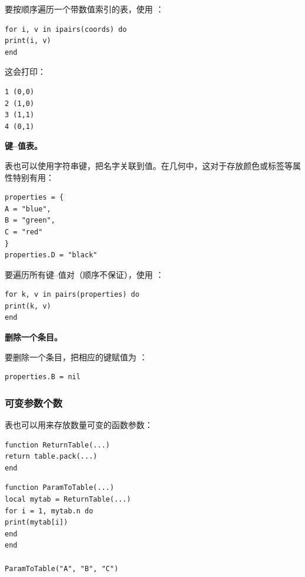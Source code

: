 要按顺序遍历一个带数值索引的表，使用 ：

\begin{mybox}
\begin{verbatim}
for i, v in ipairs(coords) do
print(i, v)
end
\end{verbatim}
\end{mybox}

这会打印：

\begin{verbatim}
1 (0,0)
2 (1,0)
3 (1,1)
4 (0,1)
\end{verbatim}


\textbf{键–值表。}

表也可以使用字符串键，把名字关联到值。在几何中，这对于存放颜色或标签等属性特别有用：

\begin{mybox}
\begin{verbatim}
properties = {
A = "blue",
B = "green",
C = "red"
}
properties.D = "black"
\end{verbatim}
\end{mybox}

要遍历所有键–值对（顺序不保证），使用 ：

\begin{mybox}
\begin{verbatim}
for k, v in pairs(properties) do
print(k, v)
end
\end{verbatim}
\end{mybox}

\textbf{删除一个条目。}

要删除一个条目，把相应的键赋值为 ：

\begin{verbatim}
properties.B = nil
\end{verbatim}



\subsubsection{可变参数个数}

表也可以用来存放数量可变的函数参数：

\begin{mybox}
\begin{verbatim}
function ReturnTable(...)
return table.pack(...)
end
\end{verbatim}
\end{mybox}

\begin{mybox}
\begin{verbatim}
function ParamToTable(...)
local mytab = ReturnTable(...)
for i = 1, mytab.n do
print(mytab[i])
end
end

ParamToTable("A", "B", "C")
\end{verbatim}
\end{mybox}

